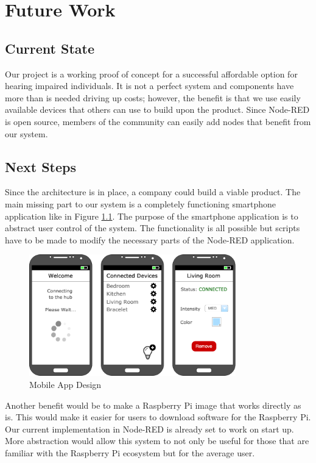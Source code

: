 \chapter{Future Work}

\section{Current State}
Our project is a working proof of concept for a successful affordable option for hearing impaired individuals. It is not  a perfect system and components have more than is needed driving up costs; however, the benefit is that we use easily available devices that others can use to build upon the product. Since Node-RED is open source, members of the community can easily add nodes that benefit from our system.

\section{Next Steps}
Since the architecture is in place, a company could build a viable product. The main missing part to our system is a completely functioning smartphone application like in Figure \ref{fig:mobile}. The purpose of the smartphone application is to abstract user control of the system. The functionality is all possible but scripts have to be made to modify the necessary parts of the Node-RED application.

\begin{figure}[h]
  \includegraphics[width=0.8\textwidth]{Phone_App.png}
  \centering
  \caption{Mobile App Design}
  \label{fig:mobile}
\end{figure}

Another benefit would be to make a Raspberry Pi image that works directly as is. This would make it easier for users to download software for the Raspberry Pi. Our current implementation in Node-RED is already set to work on start up. More abstraction would allow this system to not only be useful for those that are familiar with the Raspberry Pi ecosystem but for the average user.